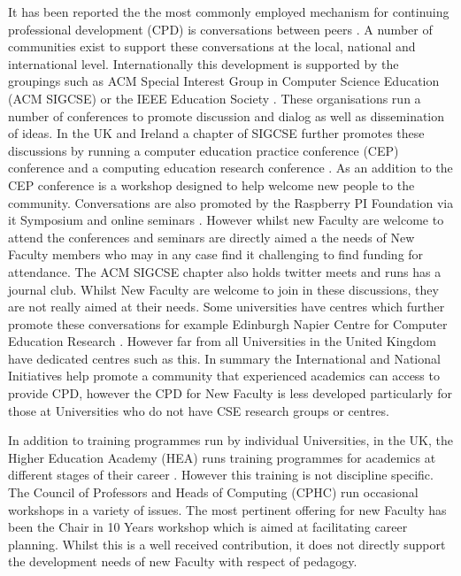 \documentclass[sigconf]{acmart}
\begin{document}
It has been reported the the most commonly employed mechanism for continuing professional development (CPD) is conversations between peers \cite{King2004} . A number of communities exist to support these conversations at the local, national and international level.  Internationally this development is supported by the groupings such as ACM Special Interest Group in Computer Science Education (ACM SIGCSE) \cite{SIGCSE} or the IEEE Education Society \cite{IEEEES}.  These organisations run a number of conferences to promote discussion and dialog as well as dissemination of ideas. In the UK and Ireland a chapter of SIGCSE \cite{UKI-SIGCSE} further promotes these discussions by running a computer education practice conference (CEP) conference \cite{CEP} and a computing education research conference \cite{UKICER}. As an addition to the CEP conference is a workshop designed to help welcome new people to the community. Conversations are also promoted by the Raspberry PI Foundation via it Symposium \cite{PI_SYM} and online seminars \cite{PI_Sem}. However whilst new Faculty are welcome to attend the conferences and seminars are directly aimed a the needs of New Faculty members who may in any case find it challenging to find funding for attendance. The ACM SIGCSE chapter also holds twitter meets and runs has a journal club. Whilst New Faculty are welcome to join in these discussions, they are not really aimed at their needs.  Some universities have centres which further promote these conversations for example Edinburgh Napier Centre for Computer Education Research \cite{Napier}. However far from all Universities in the United Kingdom have dedicated centres such as this. In summary the International and National Initiatives help promote a community that experienced academics can access to provide CPD, however the CPD for New Faculty is less developed particularly for those at Universities who do not have CSE research groups or centres.

In addition to training programmes run by individual Universities, in the UK, the Higher Education Academy (HEA) runs training programmes for academics at different stages of their career \cite{HEATraining}. However this training is not discipline specific. The Council of Professors and Heads of Computing (CPHC) run occasional workshops in a variety of issues. The most pertinent offering for new Faculty has been the Chair in 10 Years workshop which is aimed at facilitating career planning. Whilst this is a well received contribution, it does not directly support the development needs of new Faculty with respect of pedagogy.
\end{document}
